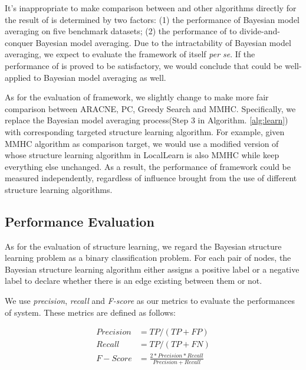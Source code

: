 It's inappropriate to make comparison between \lama{} and other algorithms directly for the result of \lama{} is determined by two factors: (1) the performance of Bayesian model averaging on five benchmark datasets; (2) the performance of \lama{} to divide-and-conquer Bayesian model averaging. Due to the intractability of Bayesian model averaging, we expect to evaluate the framework of \lama{} itself {\em per se}. If the performance of \lama{} is proved to be satisfactory, we would conclude that \lama{} could be well-applied to Bayesian model averaging as well.

As for the evaluation of \lama{} framework, we slightly change \lama{} to make more fair comparison between ARACNE, PC, Greedy Search and MMHC. Specifically, we replace the Bayesian model averaging process(Step 3 in Algorithm. \ref{alg:learn}) with corresponding targeted structure learning algorithm. For example, given MMHC algorithm as comparison target, we would use a modified version of \lama{} whose structure learning algorithm in LocalLearn is also MMHC while keep everything else unchanged. As a result, the performance of \lama{} framework could be measured independently, regardless of influence brought from the use of different structure learning algorithms.

\subsection{Performance Evaluation}
\label{exp:performEval}

As for the evaluation of structure learning, we regard the Bayesian structure learning problem as a binary classification problem. For each pair of nodes, the Bayesian structure learning algorithm either assigns a positive label or a negative label to declare whether there is an edge existing between them or not.

We use \emph{precision}, \emph{recall} and \emph{F-score} as our metrics to evaluate the performances of \lama{} system. These metrics are defined as follows:

\begin{equation}
\begin{aligned}
Precision &= TP/(TP+FP)  \nonumber \\
Recall &= TP/(TP+FN)  \nonumber \\
F-Score &= \frac{2*Precision*Recall}{Precision+Recall}
\end{aligned}
\end{equation}

